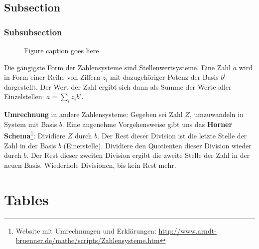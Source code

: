 \documentclass[12pt, a4paper, twopage]{scrartcl}
\begin{document}
\subsection{Subsection}






\subsubsection{Subsubsection}

%

\begin{figure}
	\centering
	\caption{Figure caption goes here\label{fig:tabelle_zweierkomplement}}
\end{figure}
%
Die gängigste Form der Zahlensysteme sind Stellenwertsysteme. Eine Zahl $a$ wird in Form einer Reihe von Ziffern $z_i$ mit dazugehöriger Potenz der Basis $b^i$ dargestellt. Der Wert der Zahl ergibt sich dann als Summe der Werte aller Einzelstellen: $a = \sum\limits_{i}z_ib^i$.

\textbf{Umrechnung} in andere Zahlensysteme: Gegeben sei Zahl $Z$, umzuwandeln in System mit Basis $b$.
Eine angenehme Vorgehensweise gibt uns das \textbf{Horner Schema}\footnote{
Website mit Umrechnungen und Erklärungen: \url{http://www.arndt-bruenner.de/mathe/scripts/Zahlensysteme.htm}
}: Dividiere $Z$ durch $b$. Der Rest dieser Division ist die letzte Stelle der Zahl in der Basis $b$  (Einerstelle). Dividiere den Quotienten dieser Division wieder durch $b$. Der Rest dieser zweiten Division ergibt die zweite Stelle der Zahl in der neuen Basis. Wiederhole Divisionen, bis kein Rest mehr.







\section{Tables}
\end{document}
